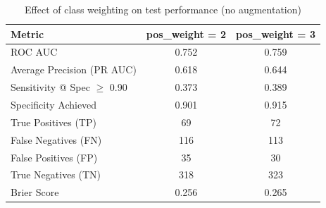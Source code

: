 \begin{table}[h]
\centering
\caption{Effect of class weighting on test performance (no augmentation)}
\label{tab:pos_weight_comparison}
\begin{tabular}{lcc}
\hline
\textbf{Metric} & \textbf{pos\_weight = 2} & \textbf{pos\_weight = 3} \\
\hline
ROC AUC & 0.752 & 0.759 \\
Average Precision (PR AUC) & 0.618 & 0.644 \\
Sensitivity @ Spec $\geq$ 0.90 & 0.373 & 0.389 \\
Specificity Achieved & 0.901 & 0.915 \\
True Positives (TP) & 69 & 72 \\
False Negatives (FN) & 116 & 113 \\
False Positives (FP) & 35 & 30 \\
True Negatives (TN) & 318 & 323 \\
Brier Score & 0.256 & 0.265 \\
\hline
\end{tabular}
\end{table}
